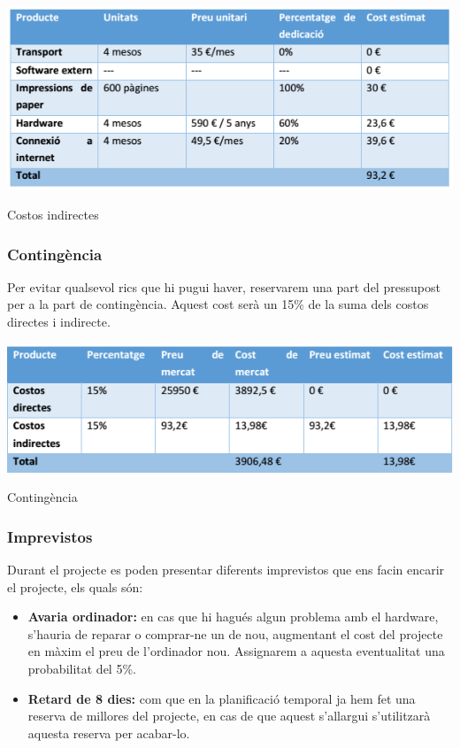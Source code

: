 \documentclass[11pt,catalan,listoffigures,listoftables]{tfgetsinf}
\begin{document}
\begin{table}[h]
\centering
\includegraphics[width=15cm]{images/taula3}
\caption[Taula 7.2]{Costos indirectes}
\centering
\end{table}

\subsubsection{Contingència}

Per evitar qualsevol rics que hi pugui haver, reservarem una part del pressupost per a la part de contingència. Aquest cost serà un 15\% de la suma dels costos directes i indirecte.

\begin{table}[h]
\centering
\includegraphics[width=15cm]{images/taula4}
\caption[Taula 7.3]{Contingència}
\centering
\end{table}

\subsubsection{Imprevistos}

Durant el projecte es poden presentar diferents imprevistos que ens facin encarir el projecte, els quals són:
\begin{itemize}
	\item \textbf{Avaria ordinador:} en cas que hi hagués algun problema amb el hardware, s’hauria de reparar o comprar-ne un de nou, augmentant el cost del projecte en màxim el preu de l’ordinador nou. Assignarem a aquesta eventualitat una probabilitat del 5\%.
	\item \textbf{Retard de 8 dies:} com que en la planificació temporal ja hem fet una reserva de millores del projecte, en cas de que aquest s’allargui s’utilitzarà aquesta reserva per acabar-lo.
\end{itemize}
\end{document}
